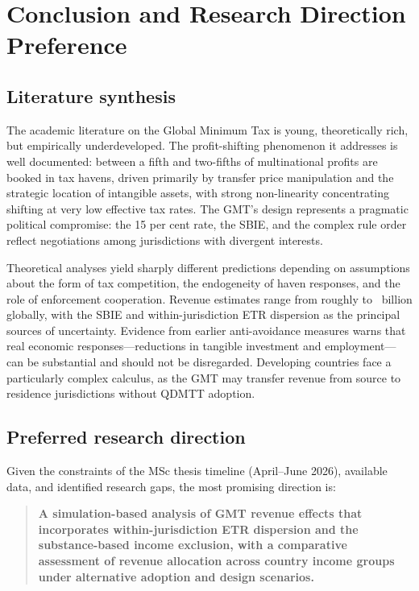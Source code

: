 \documentclass[12pt,a4paper]{article}
\begin{document}
\section{Conclusion and Research Direction Preference}\label{sec:conclusion}

\subsection{Literature synthesis}

The academic literature on the Global Minimum Tax is young, theoretically rich, but empirically underdeveloped.
The profit-shifting phenomenon it addresses is well documented: between a fifth and two-fifths of multinational profits are booked in tax havens, driven primarily by transfer price manipulation and the strategic location of intangible assets, with strong non-linearity concentrating shifting at very low effective tax rates.
The GMT's design represents a pragmatic political compromise: the 15 per cent rate, the SBIE, and the complex rule order reflect negotiations among jurisdictions with divergent interests.

Theoretical analyses yield sharply different predictions depending on assumptions about the form of tax competition, the endogeneity of haven responses, and the role of enforcement cooperation.
Revenue estimates range from roughly  to ~billion globally, with the SBIE and within-jurisdiction ETR dispersion as the principal sources of uncertainty.
Evidence from earlier anti-avoidance measures warns that real economic responses---reductions in tangible investment and employment---can be substantial and should not be disregarded.
Developing countries face a particularly complex calculus, as the GMT may transfer revenue from source to residence jurisdictions without QDMTT adoption.

\subsection{Preferred research direction}

Given the constraints of the MSc thesis timeline (April--June 2026), available data, and identified research gaps, the most promising direction is:

\begin{quote}
\textbf{A simulation-based analysis of GMT revenue effects that incorporates within-jurisdiction ETR dispersion and the substance-based income exclusion, with a comparative assessment of revenue allocation across country income groups under alternative adoption and design scenarios.}
\end{quote}
\end{document}
